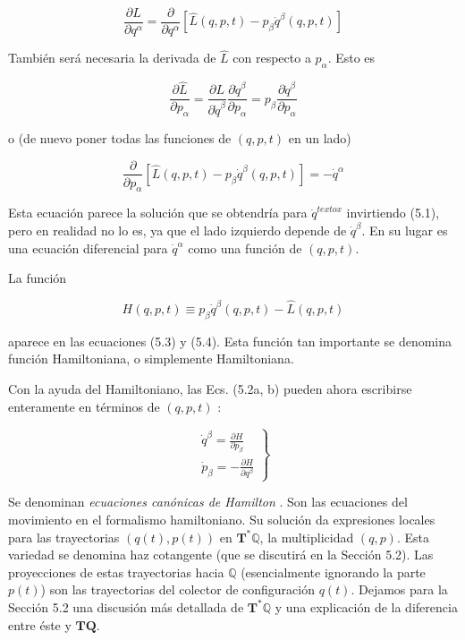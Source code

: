 \[\frac{\partial L}{\partial q^{\alpha}}=\frac{\partial}{\partial q^{\alpha}}\left[\hat{L}(q, p, t)-p_{\beta} \dot{q}^{\beta}(q, p, t)\right]\]

También será necesaria la derivada de $\hat{L}$ con respecto a $p_{\alpha}$. Esto es

\[\frac{\partial \hat{L}}{\partial p_{\alpha}}=\frac{\partial L}{\partial \dot{q}^{\beta}} \frac{\partial \dot{q}^{\beta}}{\partial p_{\alpha}}=p_{\beta} \frac{\partial \dot{q}^{\beta}}{\partial p_{\alpha}}\]

o (de nuevo poner todas las funciones de $(q, p, t)$ en un lado)

\begin{equation*}
  \frac{\partial}{\partial p_{\alpha}}\left[\hat{L}(q, p, t)-p_{\beta} \dot{q}^{\beta}(q, p, t)\right]=-\dot{q}^{\alpha} \tag{5.3}
  \end{equation*}

  Esta ecuación parece la solución que se obtendría para $\dot{q}^{text {ox }}$ invirtiendo (5.1), pero en realidad no lo es, ya que el lado izquierdo depende de $\dot{q}^{\beta}$. En su lugar es una ecuación diferencial para $\dot{q}^{\alpha}$ como una función de $(q, p, t)$.

  La función 
  
  \begin{equation*}
    H(q, p, t) \equiv p_{\beta} \dot{q}^{\beta}(q, p, t)-\hat{L}(q, p, t) \tag{5.4}
    \end{equation*}

aparece en las ecuaciones (5.3) y (5.4). Esta función tan importante se denomina función Hamiltoniana, o simplemente Hamiltoniana.


Con la ayuda del Hamiltoniano, las Ecs. (5.2a, b) pueden ahora escribirse enteramente en términos de $(q, p, t)$ :


\[\left.\begin{array}{l}
  \dot{q}^{\beta}=\frac{\partial H}{\partial p_{\beta}}  \tag{5.5}\\
  \dot{p}_{\beta}=-\frac{\partial H}{\partial q^{\beta}}
  \end{array}\right\}\]

Se denominan \textit{ecuaciones canónicas de Hamilton} . Son las ecuaciones del movimiento en el formalismo hamiltoniano. Su solución da expresiones locales para las trayectorias
$(q(t), p(t))$ en $\mathbf{T}^{*} \mathbb{Q}$, la multiplicidad $(q, p)$. Esta variedad se denomina haz cotangente (que se discutirá en la Sección 5.2). Las proyecciones de estas trayectorias hacia $\mathbb{Q}$ (esencialmente ignorando la parte $p(t)$) son las trayectorias del colector de configuración $q(t)$. Dejamos para la Sección 5.2 una discusión más detallada de $\mathbf{T}^{*} \mathbb{Q}$ y una explicación de la diferencia entre éste y $\mathbf{T Q}$.


